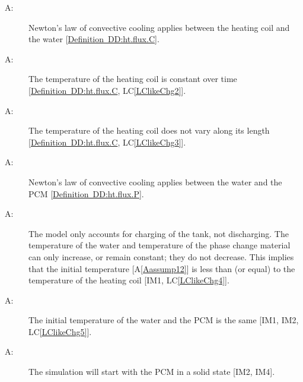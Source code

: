 \documentclass[12pt]{article}
\newcounter{assumpnum}
\newcommand{\atheassumpnum}{A\theassumpnum}
\begin{document}
\begin{description}
\item[\atheassumpnum\label{Aassump7}:]Newton's law of convective cooling applies between the heating coil and the water [\hyperref[DD:ht.flux.C]{Definition~DD:ht.flux.C}].
\end{description}
\begin{description}
\item[\atheassumpnum\label{Aassump8}:]The temperature of the heating coil is constant over time [\hyperref[DD:ht.flux.C]{Definition~DD:ht.flux.C}, LC\ref{LClikeChg2}].
\end{description}
\begin{description}
\item[\atheassumpnum\label{Aassump9}:]The temperature of the heating coil does not vary along its length [\hyperref[DD:ht.flux.C]{Definition~DD:ht.flux.C}, LC\ref{LClikeChg3}].
\end{description}
\begin{description}
\item[\atheassumpnum\label{Aassump10}:]Newton's law of convective cooling applies between the water and the PCM [\hyperref[DD:ht.flux.P]{Definition~DD:ht.flux.P}].
\end{description}
\begin{description}
\item[\atheassumpnum\label{Aassump11}:]The model only accounts for charging of the tank, not discharging. The temperature of the water and temperature of the phase change material can only increase, or remain constant; they do not decrease. This implies that the initial temperature [A\ref{Aassump12}] is less than (or equal) to the temperature of the heating coil [IM1, LC\ref{LClikeChg4}].
\end{description}
\begin{description}
\item[\atheassumpnum\label{Aassump12}:]The initial temperature of the water and the PCM is the same [IM1, IM2, LC\ref{LClikeChg5}].
\end{description}
\begin{description}
\item[\atheassumpnum\label{Aassump13}:]The simulation will start with the PCM in a solid state [IM2, IM4].
\end{description}
\end{document}
